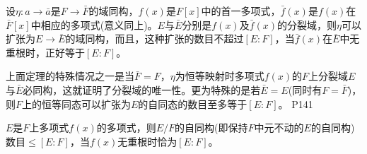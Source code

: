 \begin{theorem}
	设$\eta :a\rightarrow \bar{a}$是$F\rightarrow\bar{F}$的域同构，$f(x)$是$F[x]$中的首一多项式，$\bar{f}(x)$是$f(x)$在$\bar{F}[x]$中相应的多项式(意义同上)。$E$与$\bar{E}$分别是$f(x)$及$\bar{f}(x)$的分裂域，则$\eta$可以扩张为$E \rightarrow\bar{E}$的域同构，而且，这种扩张的数目不超过$[E:F]$，当$\bar{f}(x)$在$\bar{E}$中无重根时，正好等于$[E:F]$。
\end{theorem}

\original
{
	上面定理的特殊情况之一是当$\bar{F}=F$，$\eta$为恒等映射时多项式$f(x)$的$F$上分裂域$E$与$\bar{E}$必同构，这就证明了分裂域的唯一性。更为特殊的是若$\bar{E}=E$(同时有$F=\bar{F}$)，则$F$上的恒等同态可以扩张为$E$的自同态的数目至多等于$[E:F]$。
}
{P141}

\begin{theorem}
	$E$是$F$上多项式$f(x)$的多项式，则$E/F$的自同构(即保持$F$中元不动的$E$的自同构)数目$\leq [E:F]$，当$f(x)$无重根时恰为$[E:F]$。
\end{theorem}


























